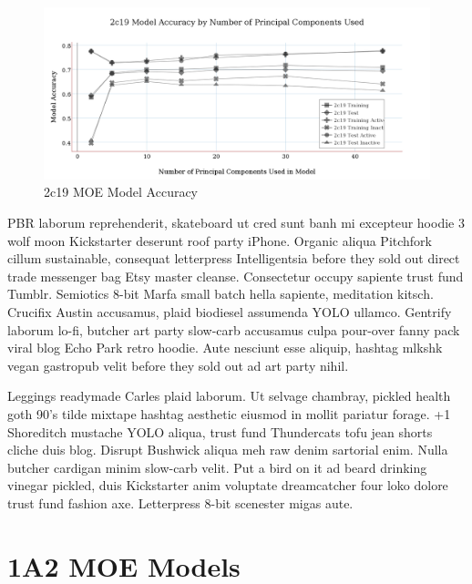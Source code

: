 \begin{figure}[!h]
\includegraphics[width=1\textwidth]{../img/2c19_moe_model_accuracy.png}
\caption{2c19 MOE Model Accuracy}
\end{figure}

PBR laborum reprehenderit, skateboard ut cred sunt banh mi excepteur hoodie 3 wolf moon Kickstarter deserunt roof party iPhone. Organic aliqua Pitchfork cillum sustainable, consequat letterpress Intelligentsia before they sold out direct trade messenger bag Etsy master cleanse. Consectetur occupy sapiente trust fund Tumblr. Semiotics 8-bit Marfa small batch hella sapiente, meditation kitsch. Crucifix Austin accusamus, plaid biodiesel assumenda YOLO ullamco. Gentrify laborum lo-fi, butcher art party slow-carb accusamus culpa pour-over fanny pack viral blog Echo Park retro hoodie. Aute nesciunt esse aliquip, hashtag mlkshk vegan gastropub velit before they sold out ad art party nihil.

Leggings readymade Carles plaid laborum. Ut selvage chambray, pickled health goth 90's tilde mixtape hashtag aesthetic eiusmod in mollit pariatur forage. +1 Shoreditch mustache YOLO aliqua, trust fund Thundercats tofu jean shorts cliche duis blog. Disrupt Bushwick aliqua meh raw denim sartorial enim. Nulla butcher cardigan minim slow-carb velit. Put a bird on it ad beard drinking vinegar pickled, duis Kickstarter anim voluptate dreamcatcher four loko dolore trust fund fashion axe. Letterpress 8-bit scenester migas aute.

\section{1A2 MOE Models}


